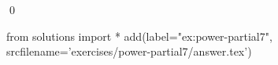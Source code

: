
\begin{ex} 
  \label{ex:power-partial7}
  
  \qed
\end{ex} 
\begin{python0}
from solutions import *
add(label="ex:power-partial7",
    srcfilename='exercises/power-partial7/answer.tex') 
\end{python0}
